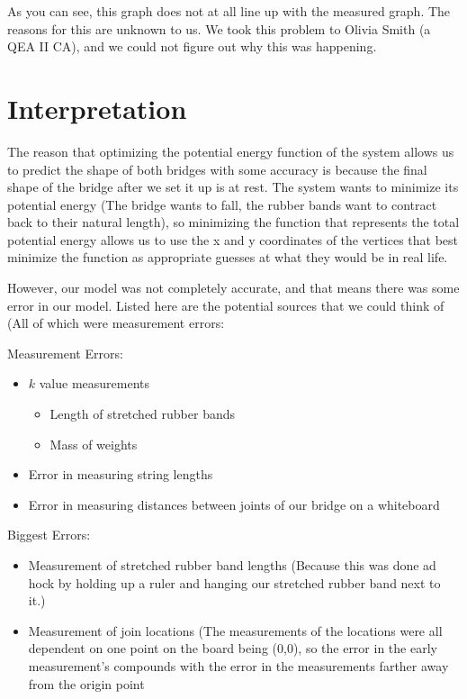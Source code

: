 \documentclass[10pt,letterpaper,onecolumn,report]{tau-class/tau}
\begin{document}
        As you can see, this graph does not at all line up with the measured graph. The reasons for this are unknown to us. We took this problem to Olivia Smith (a QEA II CA), and we could not figure out why this was happening.

\section{Interpretation}
    The reason that optimizing the potential energy function of the system allows us to predict the shape of both bridges with some accuracy is because the final shape of the bridge after we set it up is at rest. The system wants to minimize its potential energy (The bridge wants to fall, the rubber bands want to contract back to their natural length), so minimizing the function that represents the total potential energy allows us to use the x and y coordinates of the vertices that best minimize the function as appropriate guesses at what they would be in real life.
    
    However, our model was not completely accurate, and that means there was some error in our model. Listed here are the potential sources that we could think of (All of which were measurement errors:
    
    Measurement Errors:
    
    \begin{itemize}
        \item \(k\) value measurements
            \begin{itemize}
                \item Length of stretched rubber bands
            \end{itemize}
            \begin{itemize}
                \item Mass of weights
            \end{itemize}
        \item Error in measuring string lengths
        \item Error in measuring distances between joints of our bridge on a whiteboard
    \end{itemize}

    Biggest Errors:
    
    \begin{itemize}
        \item Measurement of stretched rubber band lengths (Because this was done ad hock by holding up a ruler and hanging our stretched rubber band next to it.)
        \item Measurement of join locations (The measurements of the locations were all dependent on one point on the board being (0,0), so the error in the early measurement's compounds with the error in the measurements farther away from the origin point
    \end{itemize}
    
\end{document}
